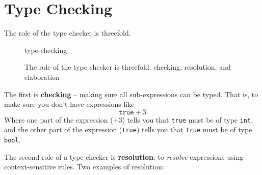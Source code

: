 {%



\section{Type Checking}\label{section:type-checking-goals}
The role of the type checker is threefold. 

\begin{figure}[H]
    \centering
    {type-checking}
    \caption{The role of the type checker is threefold: checking, resolution, and elaboration}
    \label{fig:type-inference}
\end{figure}

The first is \textbf{checking} -- making sure all sub-expressions can be typed. That is, to make sure you don't have expressions like
\[\texttt{true}+3\]
Where one part of the expression ($+3$) tells you that \texttt{true} must be of type \texttt{int}, and the other part of the expression (\texttt{true}) tells you that \texttt{true} must be of type \texttt{bool}.

The second role of a type checker is \textbf{resolution}: to \textit{resolve} expressions using context-sensitive rules. Two examples of resolution:

}
